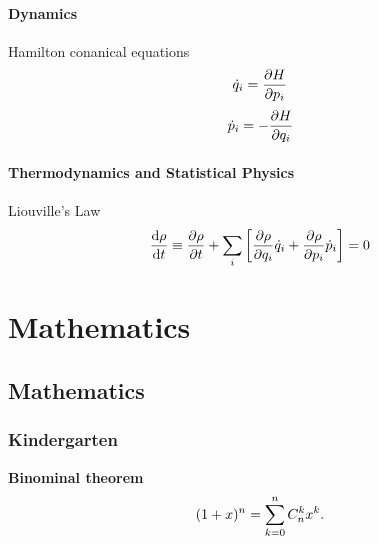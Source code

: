 \documentclass[letterpaper,10pt,english]{sphinxmanual}
\begin{document}
\subsubsection{Dynamics}
\label{Basic:dynamics}
Hamilton conanical equations
\begin{gather}
\begin{split}\dot q_i = \frac{\partial H}{\partial p_i}\end{split}\notag
\end{gather}\begin{gather}
\begin{split}\dot p_i = - \frac{\partial H}{\partial q_i}\end{split}\notag
\end{gather}

\subsubsection{Thermodynamics and Statistical Physics}
\label{Basic:thermodynamics-and-statistical-physics}
Liouville's Law
\begin{gather}
\begin{split}\frac{\mathrm d \rho}{\mathrm d t}\equiv \frac{\partial \rho}{\partial t} + \sum_i \left[ \frac{\partial \rho}{\partial q_i}\dot q_i + \frac{\partial \rho}{\partial p_i}\dot p_i \right] = 0\end{split}\notag
\end{gather}

\chapter{Mathematics}
\label{index:mathematics}

\section{Mathematics}
\label{math:mathematics}\label{math::doc}

\subsection{Kindergarten}
\label{math:kindergarten}
\textbf{Binominal theorem}
\begin{gather}
\begin{split}(1+x)^n = \sum_{k=0}^{n} C_n^k x^k .\end{split}\notag
\end{gather}
\end{document}

